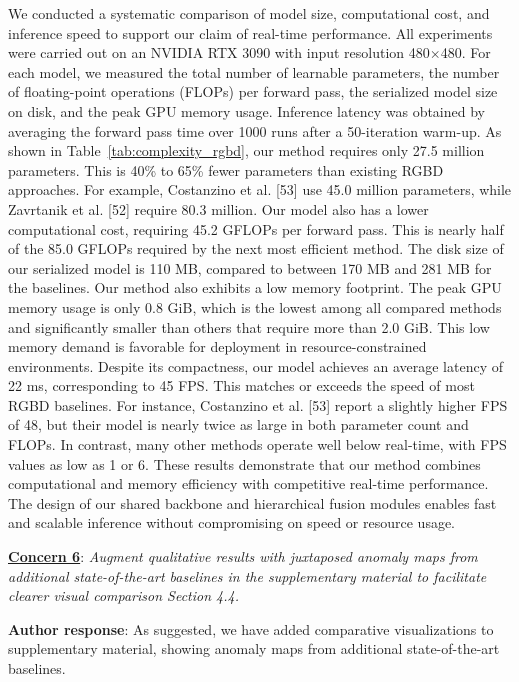 \documentclass[a4paper,fleqnn]{cas-sc}
\begin{document}
We conducted a systematic comparison of model size, computational cost, and inference speed to support our claim of real-time performance. All experiments were carried out on an NVIDIA RTX 3090 with input resolution 480\(\times\)480. For each model, we measured the total number of learnable parameters, the number of floating-point operations (FLOPs) per forward pass, the serialized model size on disk, and the peak GPU memory usage. Inference latency was obtained by averaging the forward pass time over 1000 runs after a 50-iteration warm-up. As shown in Table~\ref{tab:complexity_rgbd}, our method requires only 27.5 million parameters. This is 40\% to 65\% fewer parameters than existing RGBD approaches. For example, Costanzino et al. [53] use 45.0 million parameters, while Zavrtanik et al. [52] require 80.3 million. Our model also has a lower computational cost, requiring 45.2 GFLOPs per forward pass. This is nearly half of the 85.0 GFLOPs required by the next most efficient method. The disk size of our serialized model is 110 MB, compared to between 170 MB and 281 MB for the baselines. Our method also exhibits a low memory footprint. The peak GPU memory usage is only 0.8 GiB, which is the lowest among all compared methods and significantly smaller than others that require more than 2.0 GiB. This low memory demand is favorable for deployment in resource-constrained environments. Despite its compactness, our model achieves an average latency of 22 ms, corresponding to 45 FPS. This matches or exceeds the speed of most RGBD baselines. For instance, Costanzino et al. [53] report a slightly higher FPS of 48, but their model is nearly twice as large in both parameter count and FLOPs. In contrast, many other methods operate well below real-time, with FPS values as low as 1 or 6. These results demonstrate that our method combines computational and memory efficiency with competitive real-time performance. The design of our shared backbone and hierarchical fusion modules enables fast and scalable inference without compromising on speed or resource usage.


\vspace{1em}

\noindent \textbf{\underline{Concern 6}}: \textit{Augment qualitative results with juxtaposed anomaly maps from additional state-of-the-art baselines in the supplementary material to facilitate clearer visual comparison Section 4.4. \\}

\noindent \textbf{Author response}: As suggested, we have added comparative visualizations to supplementary material, showing anomaly maps from additional state-of-the-art baselines. \\
\end{document}

